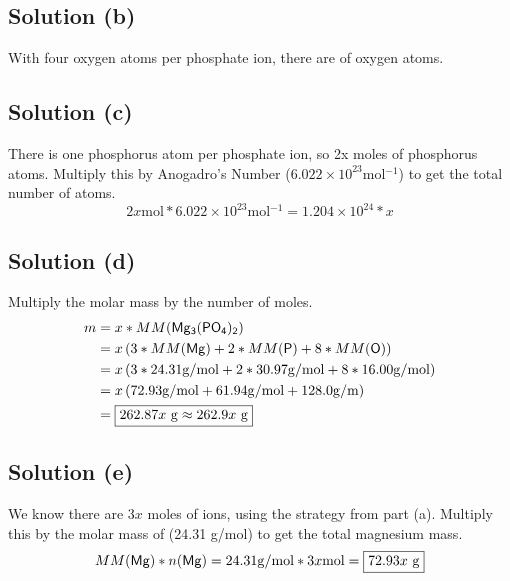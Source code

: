 \documentclass[10pt]{article}
\begin{document}
        \subsection{Solution (b)}
            With four oxygen atoms per phosphate ion, there are  of oxygen atoms.

        \subsection{Solution (c)}
            There is one phosphorus atom per phosphate ion, so 2x moles of phosphorus atoms.
            Multiply this by Anogadro's Number ($6.022 \times 10^{23} \unit{\mol^{-1}}$) to get the total number of atoms.
            \begin{equation}
                2x \unit{\mole} * 6.022 \times 10^{23} \unit{\mol^{-1}}
                    =   \boxed{1.204 \times 10^{24} * x}
            \end{equation}

        \subsection{Solution (d)}
            Multiply the molar mass by the number of moles.
            \begin{align}
                m   &=  x * MM(\ce{Mg3(PO4)2})\\
                    &=  x \left( 3*MM(\ce{Mg}) + 2 * MM(\ce{P}) + 8 * MM(\ce{O}) \right)\\
                    &=  x \left( 3 * 24.31 \unit{\gram/\mol} + 2 * 30.97 \unit{\gram/\mol} + 8 * 16.00 \unit{\gram/\mol} \right)\\
                    &=  x \left( 72.93 \unit{\gram/\mol} + 61.94 \unit{\gram/mol} + 128.0 \unit{\gram/\meter} \right)\\
                    &=  \boxed{262.87x\ \unit{\gram}
                    \approx 262.9x\ \unit{\gram}}
            \end{align}

        \subsection{Solution (e)}
            We know there are $3x$ moles of  ions, using the strategy from part (a).
            Multiply this by the molar mass of  (24.31 \unit{\gram/\mole}) to get the total magnesium mass. 
            \begin{equation}
                MM(\ce{Mg}) * n(\ce{Mg})    =   24.31 \unit{\gram/\mole} * 3x \unit{\mole}
                    =   \boxed{72.93x\ \unit{\gram}}
            \end{equation}
\end{document}
